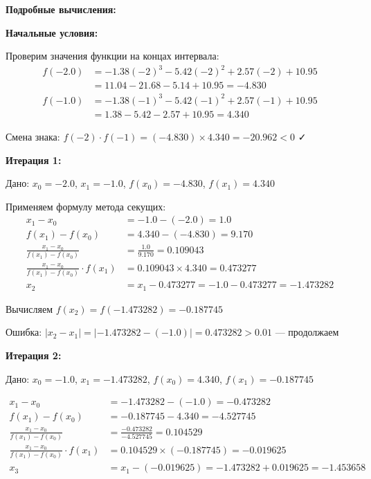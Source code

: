\documentclass[a4paper,12pt]{article}
\begin{document}
\textbf{Подробные вычисления:}

\textbf{Начальные условия:}

Проверим значения функции на концах интервала:
\begin{align*}
f(-2.0) &= -1.38(-2)^3 - 5.42(-2)^2 + 2.57(-2) + 10.95 \\
&= 11.04 - 21.68 - 5.14 + 10.95 = -4.830 \\
f(-1.0) &= -1.38(-1)^3 - 5.42(-1)^2 + 2.57(-1) + 10.95 \\
&= 1.38 - 5.42 - 2.57 + 10.95 = 4.340
\end{align*}

Смена знака: $f(-2) \cdot f(-1) = (-4.830) \times 4.340 = -20.962 < 0$ ✓

\textbf{Итерация 1:}

Дано: $x_0 = -2.0$, $x_1 = -1.0$, $f(x_0) = -4.830$, $f(x_1) = 4.340$

Применяем формулу метода секущих:
\begin{align*}
x_1 - x_0 &= -1.0 - (-2.0) = 1.0 \\
f(x_1) - f(x_0) &= 4.340 - (-4.830) = 9.170 \\
\frac{x_1 - x_0}{f(x_1) - f(x_0)} &= \frac{1.0}{9.170} = 0.109043 \\
\frac{x_1 - x_0}{f(x_1) - f(x_0)} \cdot f(x_1) &= 0.109043 \times 4.340 = 0.473277 \\
x_2 &= x_1 - 0.473277 = -1.0 - 0.473277 = -1.473282
\end{align*}

Вычисляем $f(x_2) = f(-1.473282) = -0.187745$

Ошибка: $|x_2 - x_1| = |-1.473282 - (-1.0)| = 0.473282 > 0.01$ — продолжаем

\textbf{Итерация 2:}

Дано: $x_0 = -1.0$, $x_1 = -1.473282$, $f(x_0) = 4.340$, $f(x_1) = -0.187745$

\begin{align*}
x_1 - x_0 &= -1.473282 - (-1.0) = -0.473282 \\
f(x_1) - f(x_0) &= -0.187745 - 4.340 = -4.527745 \\
\frac{x_1 - x_0}{f(x_1) - f(x_0)} &= \frac{-0.473282}{-4.527745} = 0.104529 \\
\frac{x_1 - x_0}{f(x_1) - f(x_0)} \cdot f(x_1) &= 0.104529 \times (-0.187745) = -0.019625 \\
x_3 &= x_1 - (-0.019625) = -1.473282 + 0.019625 = -1.453658
\end{align*}
\end{document}
